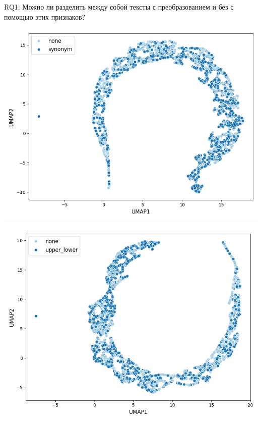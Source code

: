 \documentclass{beamer}
\begin{document}
\begin{frame}{RQ1: Можно ли разделить между собой тексты с преобразованием и без с помощью этих признаков?}
    \begin{minipage}{0.48\textwidth}
        \centering
        \includegraphics[width=\linewidth]{images_sem2/umap_synonym.png}
    \end{minipage}\hfill
    \begin{minipage}{0.48\textwidth}
        \centering
        \includegraphics[width=\linewidth]{images_sem2/umap_upper_lower.png}
    \end{minipage}
\end{frame}
\end{document}
